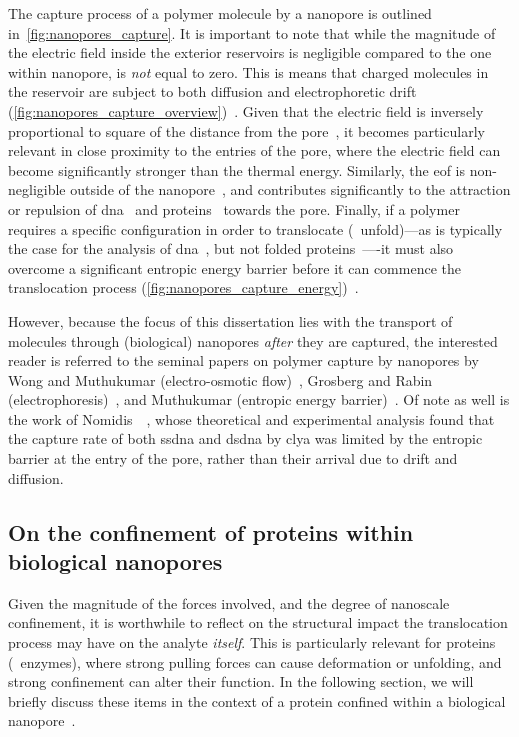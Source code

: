 The capture process of a polymer molecule by a nanopore is outlined in~\cref{fig:nanopores_capture}. It is
important to note that while the magnitude of the electric field inside the exterior reservoirs is negligible
compared to the one within nanopore, is \emph{not} equal to zero. This is means that charged molecules in the
reservoir are subject to both diffusion and electrophoretic drift
(\cref{fig:nanopores_capture_overview})~\cite{Muthukumar-2010}. Given that the electric field is inversely
proportional to square of the distance from the pore~\cite{Grosberg-2010}, it becomes particularly relevant in
close proximity to the entries of the pore, where the electric field can become significantly stronger than
the thermal energy. Similarly, the \gls{eof} is non-negligible outside of the nanopore~\cite{Wong-2007}, and
contributes significantly to the attraction or repulsion of \gls{dna}~\cite{Firnkes-2010} and
proteins~\cite{Soskine-2012,Soskine-2013} towards the pore. Finally, if a polymer requires a specific
configuration in order to translocate (\ie~unfold)---as is typically the case for the analysis of
\gls{dna}~\cite{Muthukumar-2010}, but not folded proteins~\cite{Yusko-2011,Soskine-2012,Plesa-2013}----it must
also overcome a significant entropic energy barrier before it can commence the translocation process
(\cref{fig:nanopores_capture_energy})~\cite{Muthukumar-2010}.

However, because the focus of this dissertation lies with the transport of molecules through (biological)
nanopores \emph{after} they are captured, the interested reader is referred to the seminal papers on polymer
capture by nanopores by Wong and Muthukumar (electro-osmotic flow)~\cite{Wong-2007}, Grosberg and Rabin
(electrophoresis)~\cite{Grosberg-2010}, and Muthukumar (entropic energy barrier)~\cite{Muthukumar-2010}. Of
note as well is the work of Nomidis~\etal~\cite{Nomidis-2018}, whose theoretical and experimental analysis
found that the capture rate of both \gls{ssdna} and \gls{dsdna} by \gls{clya} was limited by the entropic
barrier at the entry of the pore, rather than their arrival due to drift and diffusion.


\subsection{On the confinement of proteins within biological nanopores}
%
\label{sec:np:confinement}
%

Given the magnitude of the forces involved, and the degree of nanoscale confinement, it is worthwhile to
reflect on the structural impact the translocation process may have on the analyte \emph{itself}. This is
particularly relevant for proteins (\eg~enzymes), where strong pulling forces can cause deformation or
unfolding, and strong confinement can alter their function. In the following section, we will briefly discuss
these items in the context of a protein confined within a biological nanopore~\cite{Galenkamp-2020}.


